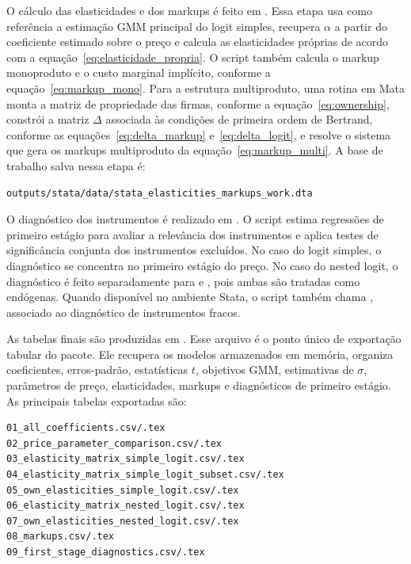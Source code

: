 \documentclass[12pt,a4paper]{article}
\begin{document}
O cálculo das elasticidades e dos markups é feito em . Essa etapa usa como referência a estimação GMM principal do logit simples, recupera $\alpha$ a partir do coeficiente estimado sobre o preço e calcula as elasticidades próprias de acordo com a equação~\eqref{eq:elasticidade_propria}. O script também calcula o markup monoproduto e o custo marginal implícito, conforme a equação~\eqref{eq:markup_mono}. Para a estrutura multiproduto, uma rotina em Mata monta a matriz de propriedade das firmas, conforme a equação~\eqref{eq:ownership}, constrói a matriz $\Delta$ associada às condições de primeira ordem de Bertrand, conforme as equações~\eqref{eq:delta_markup} e~\eqref{eq:delta_logit}, e resolve o sistema que gera os markups multiproduto da equação~\eqref{eq:markup_multi}. A base de trabalho salva nessa etapa é:

\begin{verbatim}
outputs/stata/data/stata_elasticities_markups_work.dta
\end{verbatim}

O diagnóstico dos instrumentos é realizado em . O script estima regressões de primeiro estágio para avaliar a relevância dos instrumentos e aplica testes de significância conjunta dos instrumentos excluídos. No caso do logit simples, o diagnóstico se concentra no primeiro estágio do preço. No caso do nested logit, o diagnóstico é feito separadamente para  e , pois ambas são tratadas como endógenas. Quando disponível no ambiente Stata, o script também chama , associado ao diagnóstico de instrumentos fracos.

As tabelas finais são produzidas em . Esse arquivo é o ponto único de exportação tabular do pacote. Ele recupera os modelos armazenados em memória, organiza coeficientes, erros-padrão, estatísticas $t$, objetivos GMM, estimativas de $\sigma$, parâmetros de preço, elasticidades, markups e diagnósticos de primeiro estágio. As principais tabelas exportadas são:

\begin{verbatim}
01_all_coefficients.csv/.tex
02_price_parameter_comparison.csv/.tex
03_elasticity_matrix_simple_logit.csv/.tex
04_elasticity_matrix_simple_logit_subset.csv/.tex
05_own_elasticities_simple_logit.csv/.tex
06_elasticity_matrix_nested_logit.csv/.tex
07_own_elasticities_nested_logit.csv/.tex
08_markups.csv/.tex
09_first_stage_diagnostics.csv/.tex
\end{verbatim}
\end{document}
